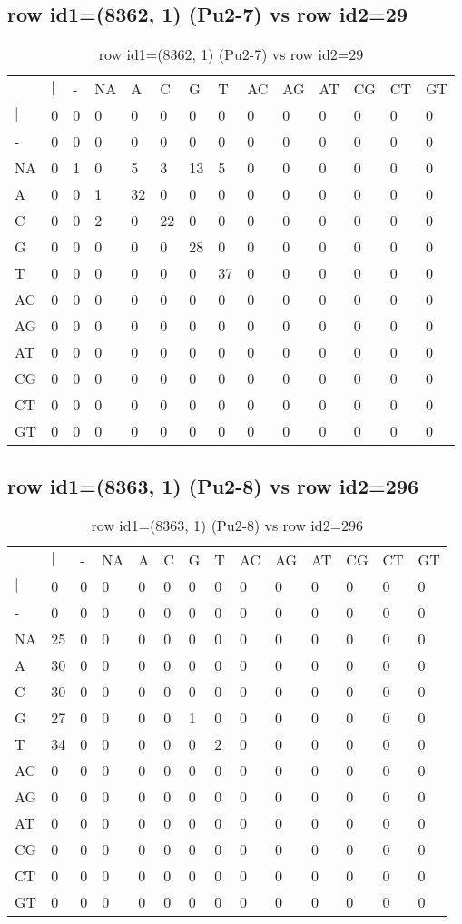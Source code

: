 \subsection{row id1=(8362, 1) (Pu2-7) vs row id2=29}
\begin{center}
\begin{longtable}{|l|l|l|l|l|l|l|l|l|l|l|l|l|l|}
\caption{row id1=(8362, 1) (Pu2-7) vs row id2=29} \label{table_dm396}\\
\hline
\\
\hline
&$|$&-&NA&A&C&G&T&AC&AG&AT&CG&CT&GT\\
$|$&0&0&0&0&0&0&0&0&0&0&0&0&0\\
-&0&0&0&0&0&0&0&0&0&0&0&0&0\\
NA&0&1&0&5&3&13&5&0&0&0&0&0&0\\
A&0&0&1&32&0&0&0&0&0&0&0&0&0\\
C&0&0&2&0&22&0&0&0&0&0&0&0&0\\
G&0&0&0&0&0&28&0&0&0&0&0&0&0\\
T&0&0&0&0&0&0&37&0&0&0&0&0&0\\
AC&0&0&0&0&0&0&0&0&0&0&0&0&0\\
AG&0&0&0&0&0&0&0&0&0&0&0&0&0\\
AT&0&0&0&0&0&0&0&0&0&0&0&0&0\\
CG&0&0&0&0&0&0&0&0&0&0&0&0&0\\
CT&0&0&0&0&0&0&0&0&0&0&0&0&0\\
GT&0&0&0&0&0&0&0&0&0&0&0&0&0\\
\hline
\end{longtable}
\end{center}

\subsection{row id1=(8363, 1) (Pu2-8) vs row id2=296}
\begin{center}
\begin{longtable}{|l|l|l|l|l|l|l|l|l|l|l|l|l|l|}
\caption{row id1=(8363, 1) (Pu2-8) vs row id2=296} \label{table_dm398}\\
\hline
\\
\hline
&$|$&-&NA&A&C&G&T&AC&AG&AT&CG&CT&GT\\
$|$&0&0&0&0&0&0&0&0&0&0&0&0&0\\
-&0&0&0&0&0&0&0&0&0&0&0&0&0\\
NA&25&0&0&0&0&0&0&0&0&0&0&0&0\\
A&30&0&0&0&0&0&0&0&0&0&0&0&0\\
C&30&0&0&0&0&0&0&0&0&0&0&0&0\\
G&27&0&0&0&0&1&0&0&0&0&0&0&0\\
T&34&0&0&0&0&0&2&0&0&0&0&0&0\\
AC&0&0&0&0&0&0&0&0&0&0&0&0&0\\
AG&0&0&0&0&0&0&0&0&0&0&0&0&0\\
AT&0&0&0&0&0&0&0&0&0&0&0&0&0\\
CG&0&0&0&0&0&0&0&0&0&0&0&0&0\\
CT&0&0&0&0&0&0&0&0&0&0&0&0&0\\
GT&0&0&0&0&0&0&0&0&0&0&0&0&0\\
\hline
\end{longtable}
\end{center}

